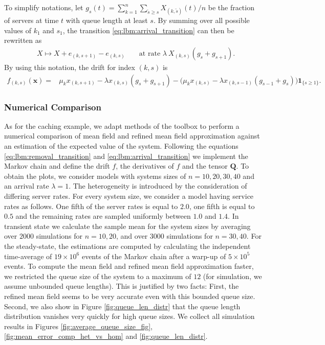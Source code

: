 \documentclass[acmsmall]{acmart}
\newcommand\bx{\mathbf{x}}
\newcommand\bQ{\mathbf{Q}}
\begin{document}
To simplify notations, let $g_{s}(t)= \sum_{k=1}^{n} \sum_{\tilde{s} \geq s} X_{(k,\tilde{s})}(t)/n$ be the fraction of servers at time $t$ with queue length at least $s$. By summing over all possible values of $k_1$ and $s_1$, the transition \eqref{eq:lbm:arrival_transition} can then be rewritten as 
\begin{align*}
  &X \mapsto X + e_{(k,s+1)} - e_{(k,s)} && \text{ at rate } \lambda \ X_{(k,s)} (g_{s} + g_{s+1}).
\end{align*}
By using this notation, the drift for index $(k,s)$ is
\begin{align*}
  f_{(k,s)}(\bx) = & \mu_k x_{(k,s+1)} - \lambda x_{(k,s)}(g_s+g_{s+1}) - \bigl( \mu_k x_{(k,s)}  - \lambda x_{(k,s-1)} (g_{s-1} + g_{s}) \bigr)\mathbf{1}_{\{s \geq1\}}.
\end{align*}


\subsubsection{Numerical Comparison}

As for the caching example, we adapt methods of the toolbox \cite{allmeier2021rmftool} to perform a numerical comparison of mean field and refined mean field approximation against an estimation of the expected value of the system. Following the equations  \eqref{eq:lbm:removal_transition} and \eqref{eq:lbm:arrival_transition} we implement the Markov chain and define the drift $f$, the derivatives of $f$ and the tensor $\bQ$. To obtain the plots, we consider models with systems sizes of $n = 10, 20, 30, 40$ and an arrival rate $\lambda = 1$. The heterogeneity is introduced by the consideration of differing server rates. For every system size, we consider a model having service rates as follows. One fifth of the server rates is equal to $2.0$, one fifth is equal to $0.5$ and the remaining rates are sampled uniformly between $1.0$ and $1.4$. In transient state we calculate the sample mean for the system sizes by averaging over $2000$ simulations for $n=10,20$, and over $3000$ simulations for $n=30, 40$. For the steady-state, the estimations are computed by calculating the independent time-average of $19\times10^6$ events of the Markov chain after a warp-up of $5 \times10^5$ events. To compute the mean field and refined mean field approximation faster, we restricted the queue size of the system to a maximum of $12$ (for simulation, we assume unbounded queue lengths). This is justified by two facts: First, the refined mean field seems to be very accurate even with this bounded queue size. Second, we also show in Figure \ref{fig:queue_len_distr} that the queue length distribution vanishes very quickly for high queue sizes. We collect all simulation results in Figures \ref{fig:average_queue_size_fig}, \ref{fig:mean_error_comp_het_vs_hom} and \ref{fig:queue_len_distr}.
\end{document}
